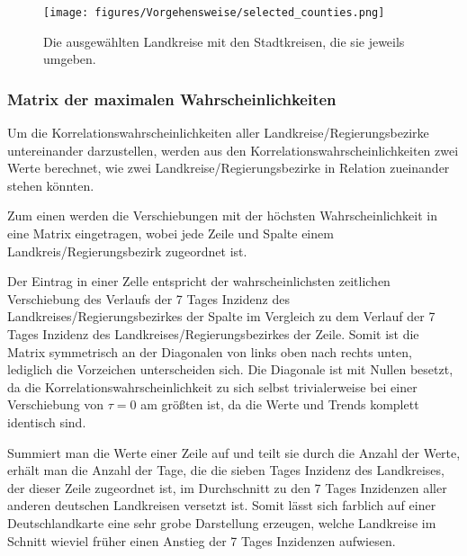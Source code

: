 \begin{figure}[H]
    \centering
    \texttt{[image: figures/Vorgehensweise/selected\_counties.png]}
    \caption{Die ausgewählten Landkreise mit den Stadtkreisen, die sie jeweils umgeben.}
    \label{fig:selected_counties}
\end{figure}

\subsubsection{Matrix der maximalen Wahrscheinlichkeiten}
Um die Korrelationswahrscheinlichkeiten aller Landkreise/Regierungsbezirke untereinander darzustellen, werden aus den Korrelationswahrscheinlichkeiten zwei Werte berechnet, wie zwei Landkreise/Regierungsbezirke in Relation zueinander stehen könnten.

Zum einen werden die Verschiebungen mit der höchsten Wahrscheinlichkeit in eine Matrix eingetragen, wobei jede Zeile und Spalte einem Landkreis/Regierungsbezirk zugeordnet ist.

Der Eintrag in einer Zelle entspricht der wahrscheinlichsten zeitlichen Verschiebung des Verlaufs der 7 Tages Inzidenz des Landkreises/Regierungsbezirkes der Spalte im Vergleich zu dem Verlauf der 7 Tages Inzidenz des Landkreises/Regierungsbezirkes der Zeile.
Somit ist die Matrix symmetrisch an der Diagonalen von links oben nach rechts unten, lediglich die Vorzeichen unterscheiden sich. Die Diagonale ist mit Nullen besetzt, da die Korrelationswahrscheinlichkeit zu sich selbst trivialerweise bei einer Verschiebung von $\tau=0$ am größten ist, da die Werte und Trends komplett identisch sind.

Summiert man die Werte einer Zeile auf und teilt sie durch die Anzahl der Werte, erhält man die Anzahl der Tage, die die sieben Tages Inzidenz des Landkreises, der dieser Zeile zugeordnet ist, im Durchschnitt zu den 7 Tages Inzidenzen aller anderen deutschen Landkreisen versetzt ist.
Somit lässt sich farblich auf einer Deutschlandkarte eine sehr grobe Darstellung erzeugen, welche Landkreise im Schnitt wieviel früher einen Anstieg der 7 Tages Inzidenzen aufwiesen.

